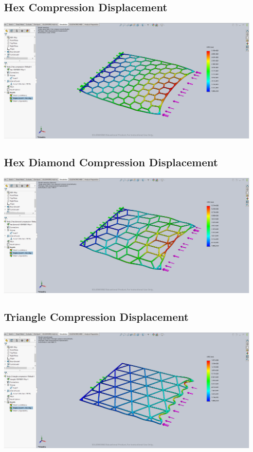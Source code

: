 \documentclass[12pt, letterpaper]{article}
\begin{document}
\begin{singlespace}
\subsection{Hex Compression Displacement}
\label{ap:h-c-d}
\includegraphics[width=0.8\linewidth]{./graphs/compression/hex-compression-displacement}

\subsection{Hex Diamond Compression Displacement}
\label{ap:hd-c-d}
\includegraphics[width=0.8\linewidth]{./graphs/compression/hex-diamond-compression-displacement}

\subsection{Triangle Compression Displacement}
\label{ap:t-c-d}
\includegraphics[width=0.8\linewidth]{./graphs/compression/triangle-compression-displacement}




\end{singlespace}
\end{document}
